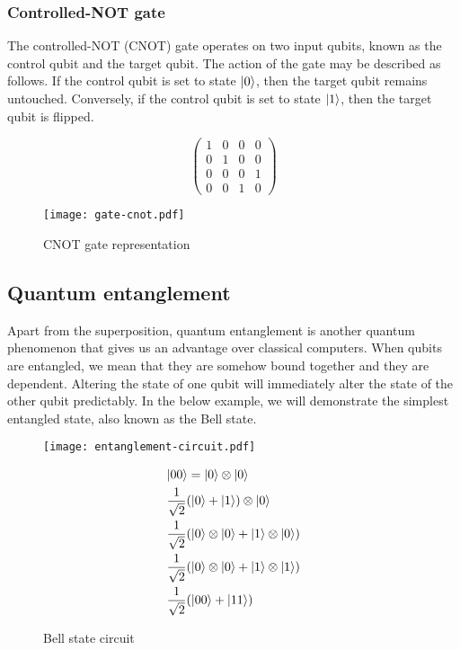 \subsubsection{Controlled-NOT gate}
The controlled-NOT (CNOT) gate operates on two input qubits, known as the control qubit and the target qubit. The action of the gate may be described as follows. If the control qubit is set to state $\lvert0\rangle$, then the target qubit remains untouched. Conversely, if the control qubit is set to state $\lvert1\rangle$, then the target qubit is flipped.

\begin{figure}[H]
  \centering
  \begin{minipage}[c]{0.4\linewidth}
    \centering
    $$\begin{pmatrix}
      1 & 0 & 0 & 0 \\
      0 & 1 & 0 & 0 \\
      0 & 0 & 0 & 1 \\
      0 & 0 & 1 & 0
  \end{pmatrix}$$
  \end{minipage}
  \begin{minipage}[c]{0.25\linewidth}
    \centering
    \texttt{[image: gate-cnot.pdf]}
  \end{minipage}
  \caption{CNOT gate representation}
\end{figure}

\tocless\subsection{Quantum entanglement}\noindent
Apart from the superposition, quantum entanglement is another quantum phenomenon that gives us an advantage over classical computers. When qubits are entangled, we mean that they are somehow bound together and they are dependent. Altering the state of one qubit will immediately alter the state of the other qubit predictably. In the below example, we will demonstrate the simplest entangled state, also known as the Bell state.

\begin{figure}[H]
\begin{minipage}{.5\textwidth}
    \centering
    \texttt{[image: entanglement-circuit.pdf]}
    \caption{Bell state circuit}
\end{minipage}
\begin{minipage}{.5\textwidth}
  \begin{align} 
             &\lvert00\rangle = \lvert0\rangle \otimes \lvert0\rangle \label{eq1} \\
             &\frac{1}{\sqrt{2}}(\lvert0\rangle + \lvert1\rangle) \otimes \lvert0\rangle \label{eq2}\\
             &\frac{1}{\sqrt{2}}(\lvert0\rangle \otimes \lvert0\rangle + \lvert1\rangle \otimes \lvert0\rangle) \label{eq3} \\
             &\frac{1}{\sqrt{2}}(\lvert0\rangle \otimes \lvert0\rangle + \lvert1\rangle \otimes \lvert1\rangle) \label{eq4}\\
             &\frac{1}{\sqrt{2}}(\lvert00\rangle + \lvert11\rangle) \label{eq5}
  \end{align}
\end{minipage}
\end{figure}

